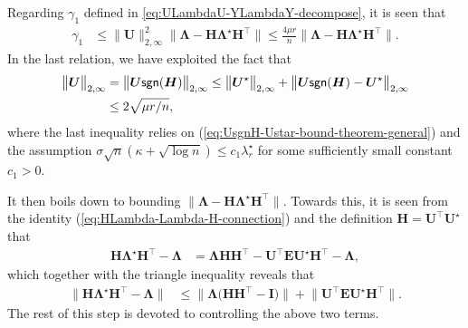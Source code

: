 Regarding $\gamma_1$ defined in \eqref{eq:ULambdaU-YLambdaY-decompose}, it is seen that
%
\begin{align}
	\gamma_{1} & \leq\big\|\bm{U}\big\|_{2,\infty}^{2}\big\|\bm{\Lambda}-\bm{H}\bm{\Lambda}^{\star}\bm{H}^{\top}\big\|\leq\frac{4\mu r}{n}\big\|\bm{\Lambda}-\bm{H}\bm{\Lambda}^{\star}\bm{H}^{\top}\big\|.
	\label{eq:gamma1-UB-12345}
\end{align}
%
In the last relation, we have exploited the fact that
%
\begin{align}
	\big\|\bm{U}\big\|_{2,\infty}&=\big\|\bm{U}\mathsf{sgn}(\bm{H})\big\|_{2,\infty}
\leq\big\|\bm{U}^{\star}\big\|_{2,\infty}+\big\|\bm{U}\mathsf{sgn}(\bm{H})-\bm{U}^{\star}\big\|_{2,\infty} \notag\\
	&\leq 2\sqrt{\mu r/n},
	\label{eq:incoherence-U-estimate}
\end{align}
%
where the last inequality relies on (\ref{eq:UsgnH-Ustar-bound-theorem-general})
and the assumption $\sigma\sqrt{n}(\kappa+\sqrt{\log n})\leq c_{1}\lambda_{r}^{\star}$
for some sufficiently small constant $c_{1}>0$.




It then boils down to bounding $\|\bm{\Lambda}-\bm{H}\bm{\Lambda}^{\star}\bm{H}^{\top}\|$.
Towards this, it is  seen from the identity (\ref{eq:HLambda-Lambda-H-connection})
and the definition $\bm{H}=\bm{U}^{\top}\bm{U}^{\star}$ that
%
\begin{align*}
\bm{H}\bm{\Lambda}^{\star}\bm{H}^{\top}-\bm{\Lambda} & =\bm{\Lambda}\bm{H}\bm{H}^{\top}-\bm{U}^{\top}\bm{E}\bm{U}^{\star}\bm{H}^{\top}-\bm{\Lambda},
\end{align*}
%
which together with the triangle inequality reveals that
%
\begin{align}
\big\|\bm{H}\bm{\Lambda}^{\star}\bm{H}^{\top}-\bm{\Lambda}\big\| & \leq\big\|\bm{\Lambda}\big(\bm{H}\bm{H}^{\top}-\bm{I}\big)\big\|+\big\|\bm{U}^{\top}\bm{E}\bm{U}^{\star}\bm{H}^{\top}\big\|.
	\label{eq:HLambda-H-ambda-bound-2terms}
\end{align}
%
The rest of this step is devoted to controlling the above two terms.


